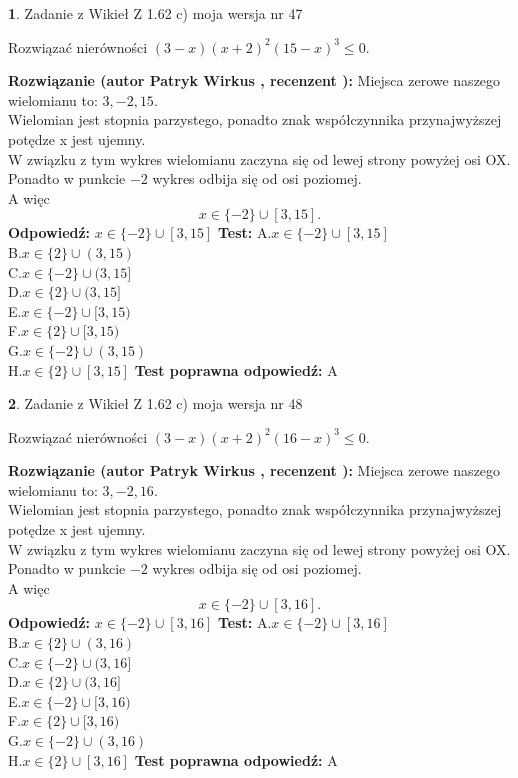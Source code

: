 \documentclass[12pt, a4paper]{article}
\theoremstyle{definition} %
\newtheorem{zad}{}
\newcommand{\zadStart}[1]{\begin{zad}#1\newline}
\newcommand{\zadStop}{\end{zad}}
\newcommand{\rozwStart}[2]{\noindent \textbf{Rozwiązanie (autor #1 , recenzent #2): }\newline}
\newcommand{\rozwStop}{\newline}
\newcommand{\odpStart}{\noindent \textbf{Odpowiedź:}\newline}
\newcommand{\odpStop}{\newline}
\newcommand{\testStart}{\noindent \textbf{Test:}\newline}
\newcommand{\testStop}{\newline}
\newcommand{\kluczStart}{\noindent \textbf{Test poprawna odpowiedź:}\newline}
\newcommand{\kluczStop}{\newline}
\begin{document}
\zadStart{Zadanie z Wikieł Z 1.62 c) moja wersja nr 47}

Rozwiązać nierówności $(3-x)(x+2)^{2}(15-x)^{3}\le0$.
\zadStop
\rozwStart{Patryk Wirkus}{}
Miejsca zerowe naszego wielomianu to: $3, -2, 15$.\\
Wielomian jest stopnia parzystego, ponadto znak współczynnika przy\linebreak najwyższej potędze x jest ujemny.\\ W związku z tym wykres wielomianu zaczyna się od lewej strony powyżej osi OX.\\
Ponadto w punkcie $-2$ wykres odbija się od osi poziomej.\\
A więc $$x \in \{-2\} \cup [3,15].$$
\rozwStop
\odpStart
$x \in \{-2\} \cup [3,15]$
\odpStop
\testStart
A.$x \in \{-2\} \cup [3,15]$\\
B.$x \in \{2\} \cup (3,15)$\\
C.$x \in \{-2\} \cup (3,15]$\\
D.$x \in \{2\} \cup (3,15]$\\
E.$x \in \{-2\} \cup [3,15)$\\
F.$x \in \{2\} \cup [3,15)$\\
G.$x \in \{-2\} \cup (3,15)$\\
H.$x \in \{2\} \cup [3,15]$
\testStop
\kluczStart
A
\kluczStop



\zadStart{Zadanie z Wikieł Z 1.62 c) moja wersja nr 48}

Rozwiązać nierówności $(3-x)(x+2)^{2}(16-x)^{3}\le0$.
\zadStop
\rozwStart{Patryk Wirkus}{}
Miejsca zerowe naszego wielomianu to: $3, -2, 16$.\\
Wielomian jest stopnia parzystego, ponadto znak współczynnika przy\linebreak najwyższej potędze x jest ujemny.\\ W związku z tym wykres wielomianu zaczyna się od lewej strony powyżej osi OX.\\
Ponadto w punkcie $-2$ wykres odbija się od osi poziomej.\\
A więc $$x \in \{-2\} \cup [3,16].$$
\rozwStop
\odpStart
$x \in \{-2\} \cup [3,16]$
\odpStop
\testStart
A.$x \in \{-2\} \cup [3,16]$\\
B.$x \in \{2\} \cup (3,16)$\\
C.$x \in \{-2\} \cup (3,16]$\\
D.$x \in \{2\} \cup (3,16]$\\
E.$x \in \{-2\} \cup [3,16)$\\
F.$x \in \{2\} \cup [3,16)$\\
G.$x \in \{-2\} \cup (3,16)$\\
H.$x \in \{2\} \cup [3,16]$
\testStop
\kluczStart
A
\kluczStop
\end{document}
